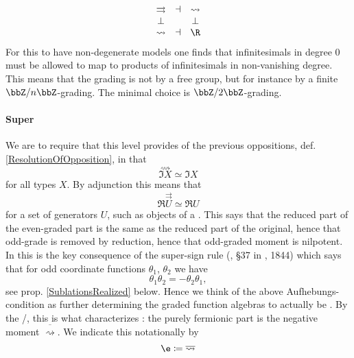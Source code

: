 \begin{displaymath}
\itexarray{
\rightrightarrows &\dashv& \rightsquigarrow
\\
\bot && \bot
\\
\rightsquigarrow &\dashv& \R
}
\end{displaymath}
For this to have non-degenerate models one finds that infinitesimals in degree 0 must be allowed to map to products of infinitesimals in non-vanishing degree. This means that the grading is not by a free group, but for instance by a finite  $\bbZ/n\bbZ$-grading. The minimal choice is $\bbZ/2\bbZ$-grading.
\hypertarget{FormalizationSuperGrading}{}\paragraph*{{Super}}\label{FormalizationSuperGrading}
We are to require that this level provides  of the previous oppositions, def. \ref{ResolutionOfOpposition}, in that
\begin{displaymath}
\stackrel{\rightsquigarrow}{\Im X} \simeq \Im X
\end{displaymath}
for all types $X$. By adjunction this means that
\begin{displaymath}
\Re \stackrel{\rightrightarrows}{U} \simeq \Re U
\end{displaymath}
for a set of generators $U$, such as objects of a .
This says that the reduced part of the even-graded part is the same as the reduced part of the original, hence that odd-grade is removed by reduction, hence that odd-graded moment is nilpotent. In  this is the key consequence of the super-sign rule (, §37 in , 1844) which says that for odd coordinate functions $\theta_1$, $\theta_2$ we have
\begin{displaymath}
\theta_1 \theta_2 = -\theta_2 \theta_1
,
\end{displaymath}
see prop. \ref{SublationsRealized} below.
Hence we think of the above Aufhebungs-condition as further determining the graded function algebras to actually be .
By the /, this is what characterizes : the purely fermionic part is the negative moment $\overline{\rightsquigarrow}$.
We indicate this notationally by
\begin{displaymath}
\e \coloneqq \overline{\rightsquigarrow}
\end{displaymath}
